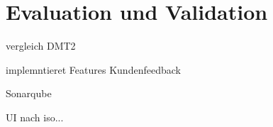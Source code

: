 
\chapter{Evaluation und Validation}

vergleich DMT2

implemntieret Features
Kundenfeedback

Sonarqube

UI nach iso...